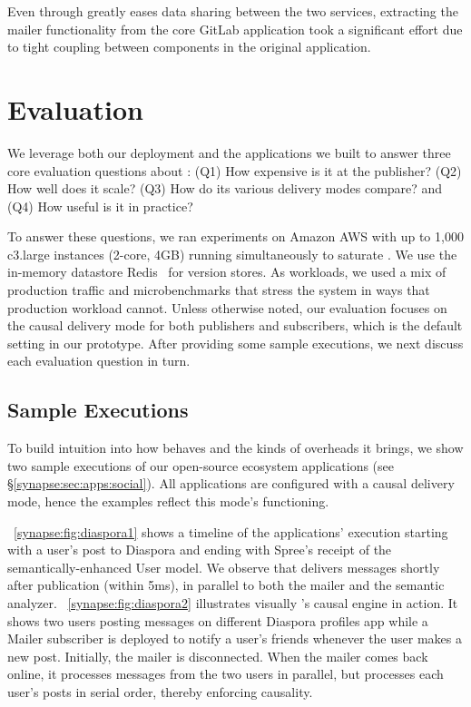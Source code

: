 Even through \synapse greatly eases data sharing between the two services,
extracting the mailer functionality from the core GitLab application took
a significant effort due to tight coupling between components in the original
application.


\section{Evaluation}
\label{synapse:sec:evaluation}


We leverage both our deployment and the applications we built to answer three
core evaluation questions about \synapse: (Q1) How expensive is it
at the publisher? (Q2) How well does it scale? (Q3) How do its various
delivery modes compare? and (Q4) How useful is it in practice?

To answer these questions, we ran experiments on Amazon AWS with up to 1,000
c3.large instances (2-core, 4GB) running simultaneously to saturate \synapse.
We use the in-memory datastore Redis~\cite{redis} for version stores.
As workloads, we used a mix of \crowdtap production traffic and microbenchmarks
that stress the system in ways that production workload cannot.  Unless
otherwise noted, our evaluation focuses on the causal delivery mode for both publishers and subscribers, which is
the default setting in our prototype.  After providing some sample executions,
we next discuss each evaluation question in turn.


\subsection{Sample Executions}
\label{synapse:sec:evaluation:sample-runs}

To build intuition into how \synapse behaves and the kinds of overheads it
brings, we show two sample executions of our open-source ecosystem
applications (see \S\ref{synapse:sec:apps:social}). All applications are configured
with a causal delivery mode, hence the examples reflect this mode's functioning.

\F~\ref{synapse:fig:diaspora1} shows a timeline of the applications' execution
starting with a user's post to Diaspora and ending with Spree's receipt of the
semantically-enhanced User model. We observe that \synapse delivers messages
shortly after publication (within 5ms), in parallel to both the mailer and
the semantic analyzer.  \F~\ref{synapse:fig:diaspora2}  illustrates visually
\synapse's causal engine in action. It shows two users posting messages on
different Diaspora profiles app while a Mailer subscriber is deployed to notify
a user's friends whenever the user makes a new post.  Initially, the mailer is
disconnected. When the mailer comes back online, it processes messages from the
two users in parallel, but processes each user's posts in serial order, thereby
enforcing causality.



